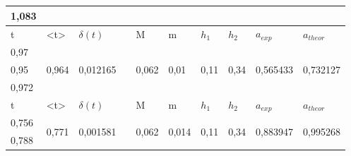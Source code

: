 \documentclass[a4paper,12pt]{article}
\begin{document}
\begin{table}[htp]
\begin{tabular}{@{}|l|l|l|l|l|l|l|l|l|l|@{}}
1,083 &                            &                           &                            &                        &                        &                       &                       &                                               & \multicolumn{1}{r}{}                          \\\hline
t     & \textless{}t\textgreater{} & $\delta(t)$               &                            & M                      & m                      & $h_1$                 & $h_2$                 & \multicolumn{1}{l}{$a_{exp}$}                 & $a_{theor}$                                   \\\hline
0,97  & \multirow{3}{*}{0,964}     & \multirow{3}{*}{0,012165} &                            & \multirow{3}{*}{0,062} & \multirow{3}{*}{0,01}  & \multirow{3}{*}{0,11} & \multirow{3}{*}{0,34} & \multirow{3}{*}{0,565433}                     & \multicolumn{1}{r}{\multirow{3}{*}{0,732127}} \\
0,95  &                            &                           &                            &                        &                        &                       &                       &                                               & \multicolumn{1}{r}{}                          \\
0,972 &                            &                           &                            &                        &                        &                       &                       &                                               & \multicolumn{1}{r}{}                          \\\hline
t     & \textless{}t\textgreater{} & $\delta(t)$               &                            & M                      & m                      & $h_1$                 & $h_2$                 & \multicolumn{1}{l}{$a_{exp}$}                 & $a_{theor}$                                   \\\hline
0,756 & \multirow{3}{*}{0,771}     & \multirow{3}{*}{0,001581} &                            & \multirow{3}{*}{0,062} & \multirow{3}{*}{0,014} & \multirow{3}{*}{0,11} & \multirow{3}{*}{0,34} & \multirow{3}{*}{0,883947}                     & \multirow{3}{*}{0,995268}                     \\
0,788 &                            &                           &                            &                        &                        &                       &                       &                                               &                                               \\

\end{tabular}
\end{table}
\end{document}
